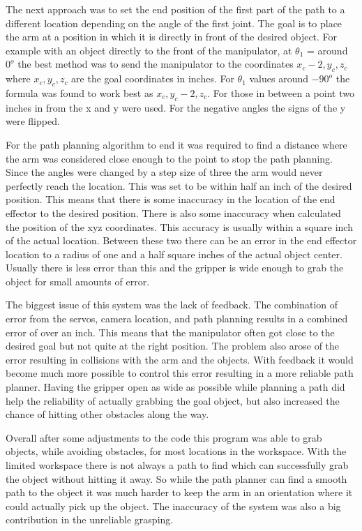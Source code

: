 The next approach was to set the end position of the first part of the path to a different location depending on the angle of the first joint. The goal is to place the arm at a position in which it is directly in front of the desired object. For example with an object directly to the front of the manipulator, at $\theta_1$ = around $0^o$ the best method was to send the manipulator to the coordinates $x_c -2 ,y_c , z_c$ where $x_c, y_c, z_c$ are the goal coordinates in inches. For $\theta_1$ values around $-90^o$ the formula was found to work best as $x_c, y_c -2, z_c$. For those in between a point two inches in from the x and y were used. For the negative angles the signs of the y were flipped. 

For the path planning algorithm to end it was required to find a distance where the arm was considered close enough to the point to stop the path planning. Since the angles were changed by a step size of three the arm would never perfectly reach the location. This was set to be within half an inch of the desired position. This means that there is some inaccuracy in the location of the end effector to the desired position. There is also some inaccuracy when calculated the position of the xyz coordinates. This accuracy is usually within a square inch of the actual location. Between these two there can be an error in the end effector location to a radius of one and a half square inches of the actual object center. Usually there is less error than this and the gripper is wide enough to grab the object for small amounts of error. 

The biggest issue of this system was the lack of feedback. The combination of error from the servos, camera location, and path planning results in a combined error of over an inch. This means that the manipulator often got close to the desired goal but not quite at the right position. The problem also arose of the error resulting in collisions with the arm and the objects. With feedback it would become much more possible to control this error resulting in a more reliable path planner. Having the gripper open as wide as possible while planning a path did help the reliability of actually grabbing the goal object, but also increased the chance of hitting other obstacles along the way.

Overall after some adjustments to the code this program was able to grab objects, while avoiding obstacles, for most locations in the workspace. With the limited workspace there is not always a path to find which can successfully grab the object without hitting it away. So while the path planner can find a smooth path to the object it was much harder to keep the arm in an orientation where it could actually pick up the object. The inaccuracy of the system was also a big contribution in the unreliable grasping.


